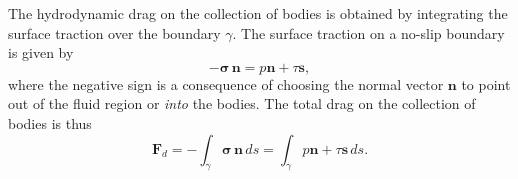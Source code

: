 \documentclass[3p]{elsarticle}
\newcommand{\nn}{{\mathbf{n}}}
\renewcommand{\ss}{{\mathbf{s}}}
\newcommand{\bvec}[1]{\mathbf{#1}}
\newcommand{\stress}{{\boldsymbol \sigma}}
\newcommand{\FD}{\bvec{F}_d}
\begin{document}
The hydrodynamic drag on the collection of bodies is obtained by integrating the surface traction over the boundary $\gamma$. The surface traction on a no-slip boundary is given by 
\begin{equation}
  - \stress \, \nn = p \nn + \tau \ss,
\end{equation}
where the negative sign is a consequence of choosing the normal vector $\nn$ to point out of the fluid region or {\em into} the bodies. The total drag on the collection of bodies is thus
\begin{equation}
  \label{eqn:drag}
  \FD =  - \int_{\gamma} \stress \, \nn \, ds 
  = \int_{\gamma} p \nn + \tau \ss \, ds.
\end{equation}

\end{document}
